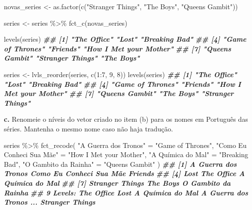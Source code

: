 \documentclass[
]{book}
\newenvironment{Shaded}{\begin{snugshade}}{\end{snugshade}}
\newcommand{\DecValTok}[1]{\textcolor[rgb]{0.00,0.00,0.81}{#1}}
\newcommand{\DocumentationTok}[1]{\textcolor[rgb]{0.56,0.35,0.01}{\textbf{\textit{#1}}}}
\newcommand{\FunctionTok}[1]{\textcolor[rgb]{0.00,0.00,0.00}{#1}}
\newcommand{\NormalTok}[1]{#1}
\newcommand{\OtherTok}[1]{\textcolor[rgb]{0.56,0.35,0.01}{#1}}
\newcommand{\SpecialCharTok}[1]{\textcolor[rgb]{0.00,0.00,0.00}{#1}}
\newcommand{\StringTok}[1]{\textcolor[rgb]{0.31,0.60,0.02}{#1}}
\begin{document}
\begin{Shaded}
\begin{Highlighting}[]
\NormalTok{novas\_series }\OtherTok{\textless{}{-}} \FunctionTok{as.factor}\NormalTok{(}\FunctionTok{c}\NormalTok{(}\StringTok{"Stranger Things"}\NormalTok{, }\StringTok{"The Boys"}\NormalTok{, }\StringTok{"Queen\textquotesingle{}s Gambit"}\NormalTok{))}

\NormalTok{series }\OtherTok{\textless{}{-}}\NormalTok{ series }\SpecialCharTok{\%\textgreater{}\%} 
  \FunctionTok{fct\_c}\NormalTok{(novas\_series) }

\FunctionTok{levels}\NormalTok{(series)}
\DocumentationTok{\#\# [1] "The Office"            "Lost"                  "Breaking Bad"         }
\DocumentationTok{\#\# [4] "Game of Thrones"       "Friends"               "How I Met your Mother"}
\DocumentationTok{\#\# [7] "Queen\textquotesingle{}s Gambit"        "Stranger Things"       "The Boys"}

\NormalTok{series }\OtherTok{\textless{}{-}} \FunctionTok{lvls\_reorder}\NormalTok{(series, }\FunctionTok{c}\NormalTok{(}\DecValTok{1}\SpecialCharTok{:}\DecValTok{7}\NormalTok{, }\DecValTok{9}\NormalTok{, }\DecValTok{8}\NormalTok{))}
\FunctionTok{levels}\NormalTok{(series)}
\DocumentationTok{\#\# [1] "The Office"            "Lost"                  "Breaking Bad"         }
\DocumentationTok{\#\# [4] "Game of Thrones"       "Friends"               "How I Met your Mother"}
\DocumentationTok{\#\# [7] "Queen\textquotesingle{}s Gambit"        "The Boys"              "Stranger Things"}
\end{Highlighting}
\end{Shaded}

\textbf{c.} Renomeie o níveis do vetor criado no item (b) para os nomes em Português das séries. Mantenha o mesmo nome caso não haja tradução.

\begin{Shaded}
\begin{Highlighting}[]
\NormalTok{series }\SpecialCharTok{\%\textgreater{}\%} 
  \FunctionTok{fct\_recode}\NormalTok{(}
    \StringTok{"A Guerra dos Tronos"} \OtherTok{=} \StringTok{"Game of Thrones"}\NormalTok{,}
    \StringTok{"Como Eu Conheci Sua Mãe"} \OtherTok{=} \StringTok{"How I Met your Mother"}\NormalTok{,}
    \StringTok{"A Química do Mal"} \OtherTok{=} \StringTok{"Breaking Bad"}\NormalTok{,}
    \StringTok{"O Gambito da Rainha"} \OtherTok{=} \StringTok{"Queen\textquotesingle{}s Gambit"}
\NormalTok{  )}
\DocumentationTok{\#\# [1] A Guerra dos Tronos     Como Eu Conheci Sua Mãe Friends                }
\DocumentationTok{\#\# [4] Lost                    The Office              A Química do Mal       }
\DocumentationTok{\#\# [7] Stranger Things         The Boys                O Gambito da Rainha    }
\DocumentationTok{\#\# 9 Levels: The Office Lost A Química do Mal A Guerra dos Tronos ... Stranger Things}
\end{Highlighting}
\end{Shaded}
\end{document}
